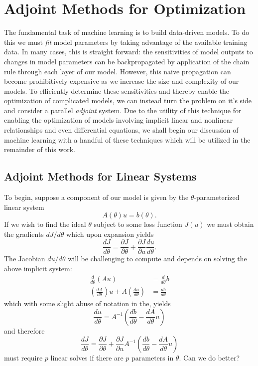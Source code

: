 \section{Adjoint Methods for Optimization}

The fundamental task of machine learning is to build data-driven models. To do this we must \textit{fit} model parameters by taking advantage of the available training data. In many cases, this is straight forward: the sensitivities of model outputs to changes in model parameters can be backpropagated by application of the chain rule through each layer of our model. However, this naive propagation can become prohibitively expensive as we increase the size and complexity of our models. To efficiently determine these sensitivities and thereby enable the optimization of complicated models, we can instead turn the problem on it's side and consider a parallel \textit{adjoint} system. Due to the utility of this technique for enabling the optimization of models involving implicit linear and nonlinear relationships and even differential equations, we shall begin our discussion of machine learning with a handful of these techniques which will be utilized in the remainder of this work.

\subsection{Adjoint Methods for Linear Systems}
To begin, suppose a component of our model is given by the $\theta$-parameterized linear system
\begin{equation}
  A(\theta)u = b(\theta).
\end{equation}
If we wish to find the ideal $\theta$ subject to some loss function $J(u)$ we must obtain the gradients $dJ/d\theta$ which upon expansion yields
\begin{equation}
  \frac{dJ}{d\theta} = \frac{\partial J}{\partial \theta} + \frac{\partial J}{\partial u}\frac{du}{d\theta}.
\end{equation}
The Jacobian $du/d\theta$ will be challenging to compute and depends on solving the above implicit system:
\begin{align*}
  \frac{d}{d\theta}(Au) &= \frac{d}{d\theta}b \\
  \left(\frac{dA}{d\theta}\right)u + A\left(\frac{du}{d\theta}\right) &= \frac{db}{d\theta}
\end{align*}
which with some slight abuse of notation in the, yields
\begin{equation}
  \frac{du}{d\theta} = A^{-1}\left(\frac{db}{d\theta} - \frac{dA}{d\theta}u \right)
\end{equation}
and therefore
\begin{equation}
  \frac{dJ}{d\theta} = \frac{\partial J}{\partial \theta} + \frac{\partial J}{\partial u}A^{-1}\left(\frac{db}{d\theta} - \frac{dA}{d\theta}u \right)
\end{equation}
must require $p$ linear solves if there are $p$ parameters in $\theta$. Can we do better?


